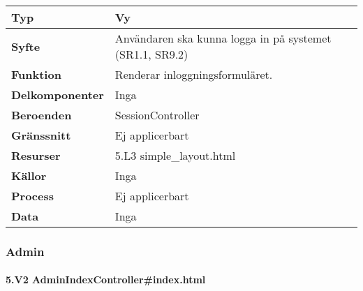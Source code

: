 \documentclass[a4paper, twoside, 11pt, titlepage]{article}
\begin{document}
			\begin {table} [ht] \begin{tabular} {  p{3.5cm} p{11.6cm} }
				\hline
				{\sffamily\textbf{Typ}} & {Vy} \\
				\hline
				{\sffamily\textbf{Syfte}} & {Användaren ska kunna logga in på systemet (SR1.1, SR9.2)} \\
				\hline
				{\sffamily\textbf{Funktion}} & {Renderar inloggningsformuläret.} \\
				\hline
				{\sffamily\textbf{Delkomponenter}} & {Inga} \\
				\hline
				{\sffamily\textbf{Beroenden}} & {SessionController} \\
				\hline
				{\sffamily\textbf{Gränssnitt}} & {Ej applicerbart} \\
				\hline
				{\sffamily\textbf{Resurser}} & {5.L3 simple\_layout.html} \\
				\hline
				{\sffamily\textbf{Källor}} & {Inga} \\
				\hline
				{\sffamily\textbf{Process}} & {Ej applicerbart} \\
				\hline
				{\sffamily\textbf{Data}} & {Inga} \\
				\hline
			\end{tabular} \end{table} \FloatBarrier


		\subsubsection{Admin}



			\paragraph{5.V2 AdminIndexController\#index.html}\
\end{document}
